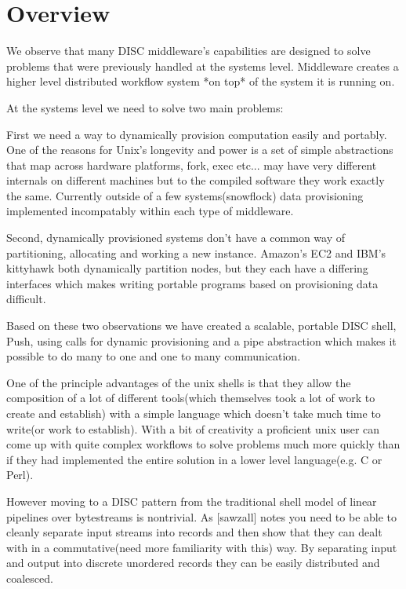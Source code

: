 \documentclass[11pt, letterpaper]{article}
\begin{document}
\section{Overview}
We observe that many DISC middleware's capabilities  are designed to solve problems that were previously handled at the systems level. Middleware     creates a higher level distributed workflow system *on top* of the system it is running on. 

At the systems level we need to solve two main problems:

First we need a way to dynamically provision computation easily and portably. One of the reasons for Unix's longevity and power is a set of simple abstractions that map across hardware platforms, fork, exec etc... may have very different internals on different machines but to the compiled software they work exactly the same. Currently outside of a few systems(snowflock) data provisioning implemented incompatably within each type of middleware.    

Second, dynamically provisioned systems don't have a common way of partitioning, allocating and working a new instance. Amazon's EC2 and IBM's kittyhawk both dynamically partition nodes, but they each have a differing interfaces which makes writing portable programs based on provisioning data difficult. 
 
 

Based on these two observations we have created a scalable, portable DISC shell, Push, using calls for dynamic provisioning and a pipe abstraction which makes it possible to do many to one and one to many communication. 

One of the principle advantages of the unix shells is that they allow the composition of a lot of different tools(which themselves took a lot of work to create and establish) with a simple language which doesn't take much time to write(or work to establish). With a bit of creativity a proficient unix user can come up with quite complex workflows to solve problems much more quickly than if they had implemented the entire solution in a lower level language(e.g. C or Perl). 

However moving to a DISC pattern from the traditional shell model of linear pipelines over bytestreams is nontrivial. 
As [sawzall] notes you need to be able to cleanly separate input streams into records and then show that they can dealt with in a commutative(need more familiarity with this) way. By separating input and output into discrete unordered records they can be easily distributed and coalesced.
\end{document}
